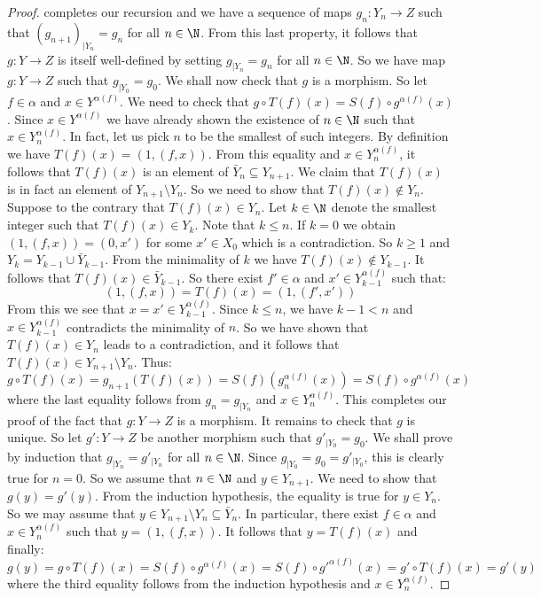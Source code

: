 \begin{proof}
completes our recursion and we have a sequence of maps $g_{n}:Y_{n}\to Z$ such
that $(g_{n+1})_{|Y_{n}}=g_{n}$ for all $n\in\N$. From this last property, it
follows that $g:Y\to Z$ is itself well-defined by setting $g_{|Y_{n}}=g_{n}$ for
all $n\in\N$. So we have map $g:Y\to Z$ such that $g_{|Y_{0}}=g_{0}$. We shall now
check that $g$ is a morphism. So let $f\in\alpha$ and $x\in Y^{\alpha(f)}$. We
need to check that $g\circ T(f)(x)=S(f)\circ g^{\alpha(f)}(x)$. Since $x\in
Y^{\alpha(f)}$ we have already shown the existence of $n\in\N$ such that $x\in
Y_{n}^{\alpha(f)}$. In fact, let us pick $n$ to be the smallest of such integers.
By definition we have $T(f)(x) = (1,(f,x))$. From this equality and $x\in
Y_{n}^{\alpha(f)}$, it follows that $T(f)(x)$ is an element of
$\bar{Y}_{n}\subseteq Y_{n+1}$. We claim that $T(f)(x)$ is in fact an element of
$Y_{n+1}\setminus Y_{n}$. So we need to show that $T(f)(x)\not\in Y_{n}$. Suppose
to the contrary that $T(f)(x)\in Y_{n}$. Let $k\in\N$ denote the smallest integer
such that $T(f)(x)\in Y_{k}$. Note that $k\leq n$. If $k=0$ we obtain $(1,(f,x)) =
(0,x')$ for some $x'\in X_{0}$ which is a contradiction. So $k\geq 1$ and
$Y_{k}=Y_{k-1}\cup\bar{Y}_{k-1}$. From the minimality of $k$ we have
$T(f)(x)\not\in Y_{k-1}$. It follows that $T(f)(x)\in\bar{Y}_{k-1}$. So there
exist $f'\in\alpha$ and $x'\in Y_{k-1}^{\alpha(f)}$ such that:
    \[
    (1,(f,x))=T(f)(x)=(1,(f',x'))
    \]
From this we see that $x=x'\in Y_{k-1}^{\alpha(f)}$. Since $k\leq n$, we have
$k-1< n$ and $x\in Y_{k-1}^{\alpha(f)}$ contradicts the minimality of $n$. So we
have shown that $T(f)(x)\in Y_{n}$ leads to a contradiction, and it follows that
$T(f)(x)\in Y_{n+1}\setminus Y_{n}$. Thus:
    \[
    g\circ T(f)(x) = g_{n+1}(T(f)(x)) = S(f)(g_{n}^{\alpha(f)}(x))=S(f)\circ
    g^{\alpha(f)}(x)
    \]
where the last equality follows from $g_{n}=g_{|Y_{n}}$ and $x\in
Y_{n}^{\alpha(f)}$. This completes our proof of the fact that $g:Y\to Z$ is a
morphism. It remains to check that $g$ is unique. So let $g':Y\to Z$ be another
morphism such that $g'_{|Y_{0}}=g_{0}$. We shall prove by induction that
$g_{|Y_{n}}=g'_{|Y_{n}}$ for all $n\in\N$. Since $g_{|Y_{0}}=g_{0}=g'_{|Y_{0}}$,
this is clearly true for $n=0$. So we assume that $n\in\N$ and $y\in Y_{n+1}$. We
need to show that $g(y)=g'(y)$. From the induction hypothesis, the equality is
true for $y\in Y_{n}$. So we may assume that $y\in Y_{n+1}\setminus
Y_{n}\subseteq\bar{Y}_{n}$. In particular, there exist $f\in\alpha$ and $x\in
Y_{n}^{\alpha(f)}$ such that $y=(1,(f,x))$. It follows that $y=T(f)(x)$ and
finally:
    \[
    g(y)=g\circ T(f)(x)=S(f)\circ g^{\alpha(f)}(x)=S(f)\circ
    g'^{\alpha(f)}(x)=g'\circ T(f)(x)=g'(y)
    \]
where the third equality follows from the induction hypothesis and $x\in
Y_{n}^{\alpha(f)}$. \end{proof}
